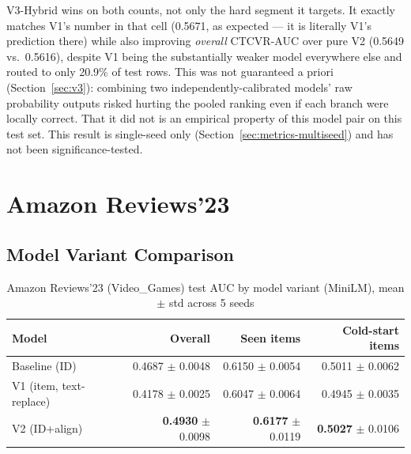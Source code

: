 \documentclass{uclthesis}
\begin{document}
V3-Hybrid wins on both counts, not only the hard segment it targets. It exactly matches V1's number in that cell (0.5671, as expected --- it is literally V1's prediction there) while also improving \emph{overall} CTCVR-AUC over pure V2 (0.5649 vs.\ 0.5616), despite V1 being the substantially weaker model everywhere else and routed to only 20.9\% of test rows. This was not guaranteed a priori (Section~\ref{sec:v3}): combining two independently-calibrated models' raw probability outputs risked hurting the pooled ranking even if each branch were locally correct. That it did not is an empirical property of this model pair on this test set. This result is single-seed only (Section~\ref{sec:metrics-multiseed}) and has not been significance-tested.

\section{Amazon Reviews'23}
\label{sec:results-amazon}

\subsection{Model Variant Comparison}
\label{sec:results-amazon-main}

\begin{table}[h]
\centering
\caption{Amazon Reviews'23 (Video\_Games) test AUC by model variant (MiniLM), mean $\pm$ std across 5 seeds}
\label{tab:amazon-main}
\begin{tabular}{lrrr}
\toprule
Model & Overall\footnotemark & Seen items & Cold-start items \\
\midrule
Baseline (ID)                & 0.4687 $\pm$ 0.0048 & 0.6150 $\pm$ 0.0054 & 0.5011 $\pm$ 0.0062 \\
V1 (item, text-replace)      & 0.4178 $\pm$ 0.0025 & 0.6047 $\pm$ 0.0064 & 0.4945 $\pm$ 0.0035 \\
V2 (ID+align)                & \textbf{0.4930} $\pm$ 0.0098 & \textbf{0.6177} $\pm$ 0.0119 & \textbf{0.5027} $\pm$ 0.0106 \\
\bottomrule
\end{tabular}
\end{table}
\end{document}
